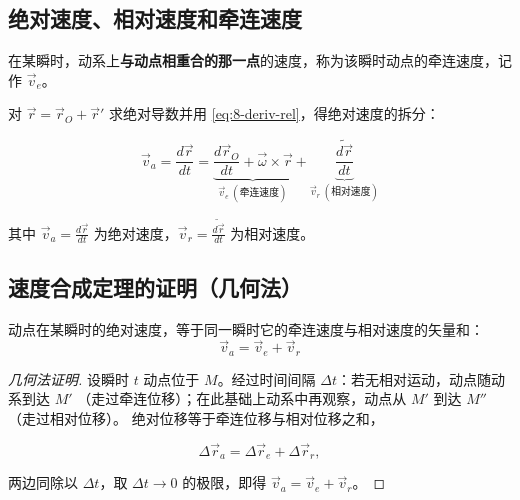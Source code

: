 \subsection{绝对速度、相对速度和牵连速度}

\begin{definition}[牵连速度]\label{def:8-ve}
在某瞬时，动系上\textbf{与动点相重合的那一点}的速度，称为该瞬时动点的牵连速度，记作 $\vec v_e$。
\end{definition}

对 $\vec r = \vec r_O + \vec r'$ 求绝对导数并用 \eqref{eq:8-deriv-rel}，得绝对速度的拆分：

\begin{equation}\label{eq:8-va-split}
  \vec v_a = \frac{d\vec r}{dt}
           = \underbrace{\frac{d\vec r_O}{dt} + \vec\omega\times\vec r}_{\textstyle \vec v_e\ (\text{牵连速度})}
           + \underbrace{\frac{\widetilde{d\vec r}}{dt}}_{\textstyle \vec v_r\ (\text{相对速度})}
\end{equation}

其中 $\vec v_a = \frac{d\vec r}{dt}$ 为绝对速度，$\vec v_r = \frac{\widetilde{d\vec r}}{dt}$ 为相对速度。

\subsection{速度合成定理的证明（几何法）}

\begin{theorem}[速度合成定理]\label{thm:8-vsum}
动点在某瞬时的绝对速度，等于同一瞬时它的牵连速度与相对速度的矢量和：
\begin{equation}\label{eq:8-vsum}
  \boxed{\ \vec v_a = \vec v_e + \vec v_r\ }
\end{equation}
\end{theorem}

\begin{proof}[几何法证明]
设瞬时 $t$ 动点位于 $M$。经过时间间隔 $\Delta t$：若无相对运动，动点随动系到达 $M'$
（走过牵连位移）；在此基础上动系中再观察，动点从 $M'$ 到达 $M''$（走过相对位移）。
绝对位移等于牵连位移与相对位移之和，

\begin{equation}\label{eq:8-disp-sum}
  \Delta\vec r_a = \Delta\vec r_e + \Delta\vec r_r ,
\end{equation}

两边同除以 $\Delta t$，取 $\Delta t \to 0$ 的极限，即得
$\vec v_a = \vec v_e + \vec v_r$。
\end{proof}


